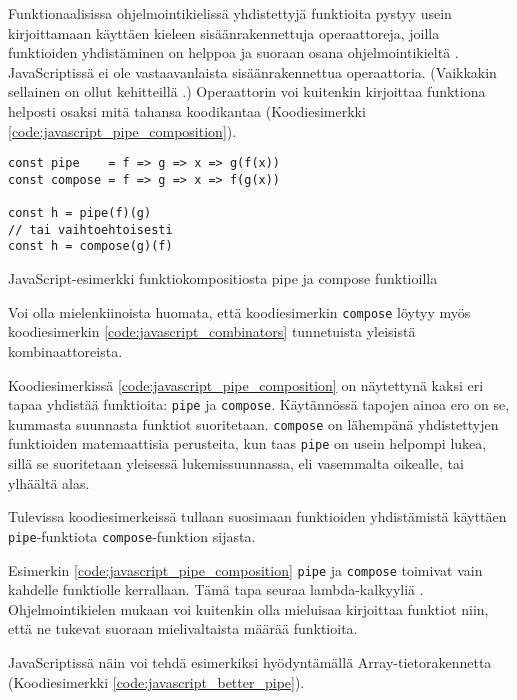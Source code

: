 Funktionaalisissa ohjelmointikielissä yhdistettyjä funktioita pystyy usein kirjoittamaan käyttäen kieleen sisäänrakennettuja operaattoreja, joilla funktioiden yhdistäminen on helppoa ja suoraan osana ohjelmointikieltä \cite{fsharpcomposition,haskellcomposition}.
JavaScriptissä ei ole vastaavanlaista sisäänrakennettua operaattoria.
(Vaikkakin sellainen on ollut kehitteillä \cite{tc39_pipeline_operator}.)
Operaattorin voi kuitenkin kirjoittaa funktiona helposti osaksi mitä tahansa koodikantaa (Koodiesimerkki \ref{code:javascript_pipe_composition}).

\begin{code}
    \begin{verbatim}
const pipe    = f => g => x => g(f(x))
const compose = f => g => x => f(g(x))

const h = pipe(f)(g)
// tai vaihtoehtoisesti
const h = compose(g)(f)
\end{verbatim}
    \caption{JavaScript-esimerkki funktiokompositiosta pipe ja compose funktioilla}
    \label{code:javascript_pipe_composition}
\end{code}

Voi olla mielenkiinoista huomata, että koodiesimerkin \texttt{compose} löytyy myös koodiesimerkin \ref{code:javascript_combinators} tunnetuista yleisistä kombinaattoreista.

Koodiesimerkissä \ref{code:javascript_pipe_composition} on näytettynä kaksi eri tapaa yhdistää funktioita: \texttt{pipe} ja \texttt{compose}. Käytännössä tapojen ainoa ero on se, kummasta suunnasta funktiot suoritetaan. \texttt{compose} on lähempänä yhdistettyjen funktioiden matemaattisia perusteita, kun taas \texttt{pipe} on usein helpompi lukea, sillä se suoritetaan yleisessä lukemissuunnassa, eli vasemmalta oikealle, tai ylhäältä alas. \citep{whyprefercompose}

Tulevissa koodiesimerkeissä tullaan suosimaan funktioiden yhdistämistä käyttäen \texttt{pipe}-funktiota \texttt{compose}-funktion sijasta.

Esimerkin \ref{code:javascript_pipe_composition} \texttt{pipe} ja \texttt{compose} toimivat vain kahdelle funktiolle kerrallaan. Tämä tapa seuraa lambda-kalkyyliä \cite{computerphile_lambda}. Ohjelmointikielen mukaan voi kuitenkin olla mieluisaa kirjoittaa funktiot niin, että ne tukevat suoraan mielivaltaista määrää funktioita.

JavaScriptissä näin voi tehdä esimerkiksi hyödyntämällä Array-tietorakennetta (Koodiesimerkki \ref{code:javascript_better_pipe}).

